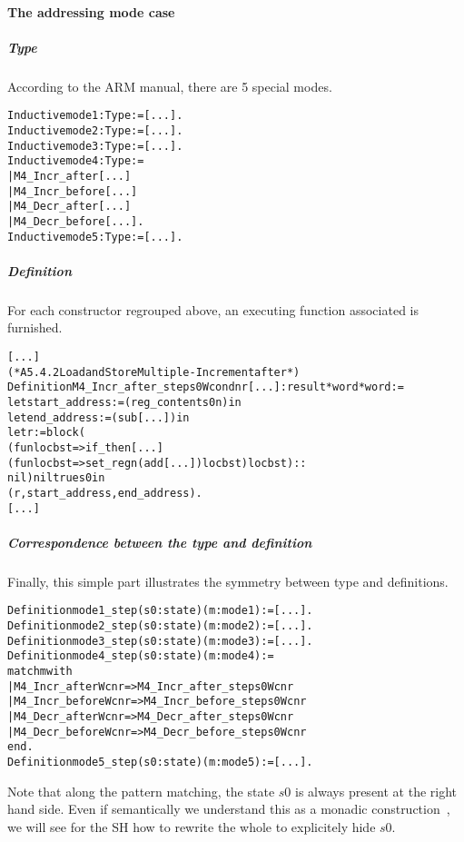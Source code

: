 \documentclass[a4paper, 11pt]{article}
\newenvironment{coq}
  {%
   \begin{alltt}} %% 8.3pl1 (January 2011)
  {\end{alltt} %
  }
\begin{document}
\paragraph{The addressing mode case}
  \subparagraph{Type}
According to the ARM manual, there are 5 special modes.
\begin{coq}
Inductive mode1 : Type := [...].
Inductive mode2 : Type := [...].
Inductive mode3 : Type := [...].
Inductive mode4 : Type :=
  | M4\_Incr\_after         [...] 
  | M4\_Incr\_before        [...]
  | M4\_Decr\_after         [...]
  | M4\_Decr\_before        [...].
Inductive mode5 : Type := [...].  
\end{coq}
  \subparagraph{Definition}
For each constructor regrouped above, an executing function associated is furnished.
\begin{coq}
[...]
(* A5.4.2 Load and Store Multiple - Increment after *)
Definition M4_Incr_after_step s0 W cond n r [...] : result * word * word :=
  let start_address := (reg_content s0 n) in
  let end_address := (sub [...]) in
  let r := block (
    (fun loc b st => if_then [...]
      (fun loc b st => set_reg n (add [...]) loc b st) loc b st) ::
    nil) nil true s0 in
    (r, start_address, end_address).
[...]
\end{coq}
  \subparagraph{Correspondence between the type and definition}
Finally, this simple part illustrates the symmetry between type and definitions. 
\begin{coq}
Definition mode1\_step (s0 : state) (m : mode1) := [...].
Definition mode2\_step (s0 : state) (m : mode2) := [...].
Definition mode3\_step (s0 : state) (m : mode3) := [...].
Definition mode4\_step (s0 : state) (m : mode4) :=
  match m with
    | M4\_Incr\_after W c n r => M4\_Incr\_after\_step s0 W c n r
    | M4\_Incr\_before W c n r => M4\_Incr\_before\_step s0 W c n r
    | M4\_Decr\_after W c n r => M4\_Decr\_after\_step s0 W c n r
    | M4\_Decr\_before W c n r => M4\_Decr\_before\_step s0 W c n r
  end.
Definition mode5\_step (s0 : state) (m : mode5) := [...].
\end{coq}
Note that along the pattern matching, the state $s0$ is always present at the right hand side. Even if semantically we understand this as a monadic construction~\cite{peyton-jones-wadler-93, peyton-jones-tackling-09}, we will see for the SH how to rewrite the whole to explicitely hide $s0$.
\end{document}
